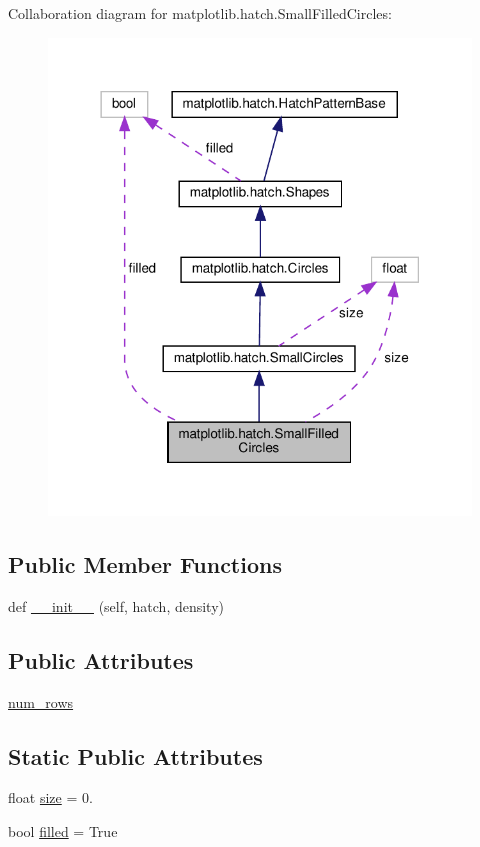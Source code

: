 Collaboration diagram for matplotlib.\+hatch.\+Small\+Filled\+Circles\+:
\nopagebreak
\begin{figure}[H]
\begin{center}
\leavevmode
\includegraphics[width=318pt]{classmatplotlib_1_1hatch_1_1SmallFilledCircles__coll__graph}
\end{center}
\end{figure}
\subsection*{Public Member Functions}
\begin{DoxyCompactItemize}
\item 
def \hyperlink{classmatplotlib_1_1hatch_1_1SmallFilledCircles_a855478407e5df5261331d22ee728cd94}{\+\_\+\+\_\+init\+\_\+\+\_\+} (self, hatch, density)
\end{DoxyCompactItemize}
\subsection*{Public Attributes}
\begin{DoxyCompactItemize}
\item 
\hyperlink{classmatplotlib_1_1hatch_1_1SmallFilledCircles_a84ba635686ac3029c2ab141acf35d5f2}{num\+\_\+rows}
\end{DoxyCompactItemize}
\subsection*{Static Public Attributes}
\begin{DoxyCompactItemize}
\item 
float \hyperlink{classmatplotlib_1_1hatch_1_1SmallFilledCircles_a6ceca6a1eec178c3de9d920215e8b0c7}{size} = 0.
\item 
bool \hyperlink{classmatplotlib_1_1hatch_1_1SmallFilledCircles_a23a2eca42b3c87a97411eab73668e566}{filled} = True
\end{DoxyCompactItemize}


